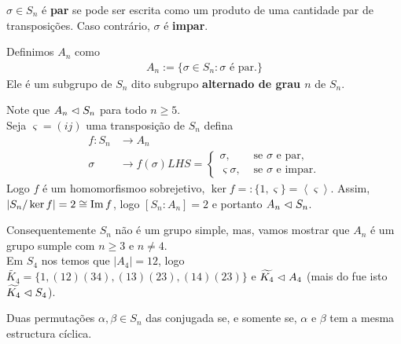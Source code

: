 \begin{definition}
  $\sigma\in S_n$ é \textbf{par} se pode ser escrita como um produto de uma cantidade par de transposições. Caso contrário, $\sigma$ é \textbf{impar}. 
\end{definition}
\begin{definition}[$A_n$]
  Definimos $A_n$ como
  \begin{align*}
    A_n:=\{\sigma\in S_n:\sigma\text{ é par.}\}
  \end{align*}
  Ele é um subgrupo de $S_n$ dito subgrupo \textbf{alternado de grau $n$} de $S_n$.
\end{definition}
\begin{note}[$A_n\normal S_n$]
  Note que $A_n\normal S_n$ para todo $n\geq 5$.\\
  Seja $\varsigma=(ij)$ uma transposição de $S_n$ defina
  \begin{align*}
    f:S_n&\to A_n\\
    \sigma&\to f(\sigma)LHS= 
    \begin{cases}
      \sigma, &\text{ se } \sigma\text{ e par} \text{,} \\
      \varsigma\sigma, &\text{ se } \sigma\text{ e impar} .
    \end{cases}
  \end{align*}
  Logo $f$ é um homomorfismoo sobrejetivo, $\ker f=:\{1,\varsigma\}=\left\langle \varsigma \right\rangle$. Assim, $|S_n/\ker f|=2\cong \operatorname{Im} f$, logo $[S_n:A_n]=2$ e portanto $A_n\normal S_n$. 
\end{note}
Consequentemente $S_n$ não é um grupo simple, mas, vamos mostrar que $A_n$ é um grupo sumple com $n\geq 3$ e $n\neq 4$.\\ 
Em $S_4$ nos temos que $|A_4|=12$, logo $\tilde{K_4}=\{1,(12)(34),(13)(23),(14)(23)\}$ e $\widetilde{K_4}\vartriangleleft A_4$ (mais do fue isto $\widetilde{K_4}\vartriangleleft S_4$).
\begin{proposition}
  Duas permutações $\alpha,\beta\in S_n$ das conjugada se, e somente se, $\alpha$ e $\beta$ tem a mesma estructura cíclica.
\end{proposition}
